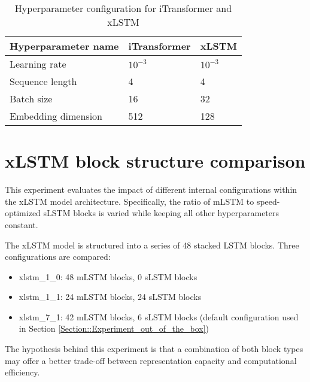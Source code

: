 \documentclass[class=scrbook, crop=false]{standalone}
\begin{document}


\begin{table}[]
\centering
\begin{tabular}{l|l|l}
 Hyperparameter name & iTransformer & xLSTM   \\\hline
 Learning rate & $10^{-3}$ & $10^{-3} $ \\
 Sequence length & 4 & 4  \\
 Batch size & 16 & 32  \\
 Embedding dimension & 512 & 128  \\
 
\end{tabular}
\caption{Hyperparameter configuration for iTransformer and xLSTM}
\label{Table::Raw_hyperparameters}
\end{table}

\section{xLSTM block structure comparison}

This experiment evaluates the impact of different internal configurations within the xLSTM model architecture. Specifically, the ratio of \gls{mLSTM} to speed-optimized \gls{sLSTM} blocks is varied while keeping all other hyperparameters constant.

The xLSTM model is structured into a series of 48 stacked LSTM blocks. Three configurations are compared:
\begin{itemize}
\item xlstm\_1\_0: 48 mLSTM blocks, 0 sLSTM blocks
\item xlstm\_1\_1: 24 mLSTM blocks, 24 sLSTM blocks
\item xlstm\_7\_1: 42 mLSTM blocks, 6 sLSTM blocks (default configuration used in Section \ref{Section::Experiment_out_of_the_box})
\end{itemize}
The hypothesis behind this experiment is that a combination of both block types may offer a better trade-off between representation capacity and computational efficiency.
\end{document}
